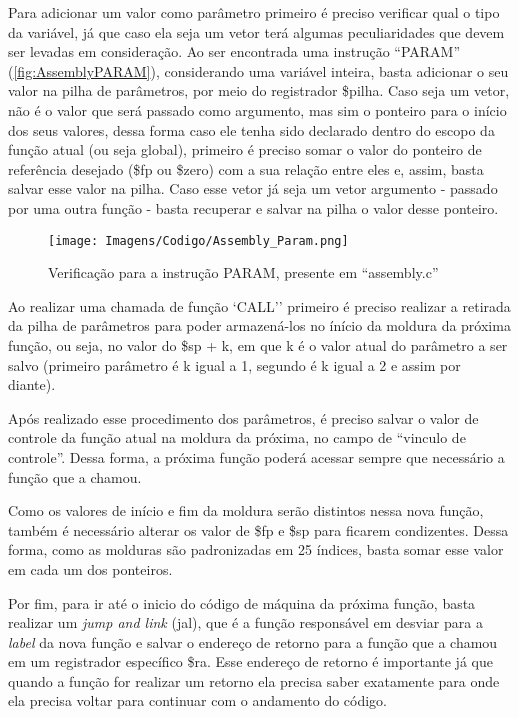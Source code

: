 \documentclass[
	12pt,				%
	oneside,
	a4paper,			%
	english,			%
	french,				%
	spanish,			%
	brazil,				%
	]{abntex2}
\begin{document}
Para adicionar um valor como parâmetro primeiro é preciso verificar qual o tipo da variável, já que caso ela seja um vetor terá algumas peculiaridades que devem ser levadas em consideração. Ao ser encontrada uma instrução ``PARAM'' (\autoref{fig:AssemblyPARAM}), considerando uma variável inteira, basta adicionar o seu valor na pilha de parâmetros, por meio do registrador \$pilha. Caso seja um vetor, não é o valor que será passado como argumento, mas sim o ponteiro para o início dos seus valores, dessa forma caso ele tenha sido declarado dentro do escopo da função atual (ou seja global), primeiro é preciso somar o valor do ponteiro de referência desejado (\$fp ou \$zero) com a sua relação entre eles e, assim, basta salvar esse valor na pilha. Caso esse vetor já seja um vetor argumento - passado por uma outra função - basta recuperar e salvar na pilha o valor desse ponteiro.

\begin{figure}[H]
\centering 
\caption{Verificação para a instrução PARAM, presente em \nohyphens{``assembly.c''}} 
\label{fig:AssemblyPARAM}
\graphicspath{ {./Imagens/} } 
\texttt{[image: Imagens/Codigo/Assembly\_Param.png]}
\end{figure}

Ao realizar uma chamada de função `CALL'' primeiro é preciso realizar a retirada da pilha de parâmetros para poder armazená-los no ínício da moldura da próxima função, ou seja, no valor do \$sp + k, em que k é o valor atual do parâmetro a ser salvo (primeiro parâmetro é k igual a 1, segundo é k igual a 2 e assim por diante). 

Após realizado esse procedimento dos parâmetros, é preciso salvar o valor de controle da função atual na moldura da próxima, no campo de ``vinculo de controle''. Dessa forma, a próxima função poderá acessar sempre que necessário a função que a chamou.

Como os valores de início e fim da moldura serão distintos nessa nova função, também é necessário alterar os valor de \$fp e \$sp para ficarem condizentes. Dessa forma, como as molduras são padronizadas em 25 índices, basta somar esse valor em cada um dos ponteiros. 

Por fim, para ir até o inicio do código de máquina da próxima função, basta realizar um \emph{jump and link} (jal), que é a função responsável em desviar para a \emph{label} da nova função e salvar o endereço de retorno para a função que a chamou em um registrador específico \$ra. Esse endereço de retorno é importante já que quando a função for realizar um retorno ela precisa saber exatamente para onde ela precisa voltar para continuar com o andamento do código.
\end{document}
